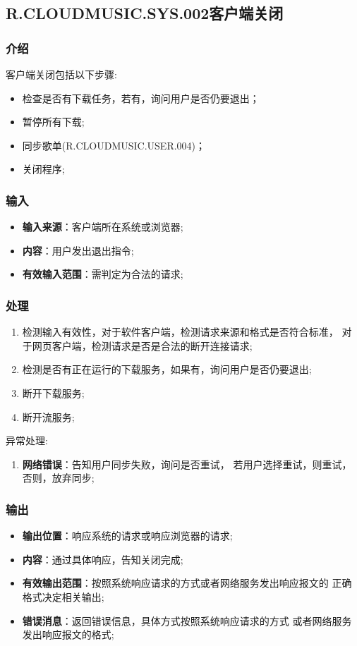 \subsection{R.CLOUDMUSIC.SYS.002客户端关闭}
\subsubsection{介绍}
客户端关闭包括以下步骤:
	\begin{itemize}
		\item 检查是否有下载任务，若有，询问用户是否仍要退出；
		\item 暂停所有下载;
		\item 同步歌单(R.CLOUDMUSIC.USER.004)；
		\item 关闭程序;
	\end{itemize}
\subsubsection{输入}
	\begin{itemize}
		\item \textbf{输入来源}：客户端所在系统或浏览器;
		\item \textbf{内容}：用户发出退出指令;
		\item \textbf{有效输入范围}：需判定为合法的请求;
	\end{itemize}
\subsubsection{处理}
	\begin{enumerate}
		\item 检测输入有效性，对于软件客户端，检测请求来源和格式是否符合标准，
			对于网页客户端，检测请求是否是合法的断开连接请求;
		\item 检测是否有正在运行的下载服务，如果有，询问用户是否仍要退出;
		\item 断开下载服务;
		\item 断开流服务;
	\end{enumerate}
	\noindent 异常处理:
	\begin{enumerate}
		\item \textbf{网络错误}：告知用户同步失败，询问是否重试，
			若用户选择重试，则重试，否则，放弃同步;
	\end{enumerate}
\subsubsection{输出}
\begin{itemize}
	\item \textbf{输出位置}：响应系统的请求或响应浏览器的请求;
	\item \textbf{内容}：通过具体响应，告知关闭完成;
	\item \textbf{有效输出范围}：按照系统响应请求的方式或者网络服务发出响应报文的
		正确格式决定相关输出;
	\item \textbf{错误消息}：返回错误信息，具体方式按照系统响应请求的方式
		或者网络服务发出响应报文的格式;
\end{itemize}

